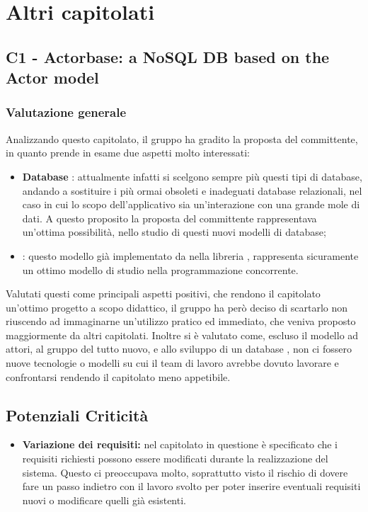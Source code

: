 \section{Altri capitolati}

\subsection{C1 - Actorbase: a NoSQL DB based on the Actor model}
\subsubsection{Valutazione generale}
Analizzando questo capitolato, il gruppo ha gradito la proposta del committente, in quanto prende in esame due aspetti molto interessati:
\begin{itemize}
	\item \textbf{Database }: attualmente infatti si scelgono sempre pi\`u questi tipi di database, andando a sostituire i pi\`u ormai obsoleti e inadeguati database relazionali, nel caso in cui lo scopo dell'applicativo sia un'interazione con una grande mole di dati.
	A questo proposito la proposta del committente rappresentava un'ottima possibilit\`a, nello studio di questi nuovi modelli di database;
	\item \textbf{}: questo modello gi\`a implementato da nella libreria , rappresenta sicuramente un ottimo modello di studio nella programmazione concorrente.
\end{itemize}
Valutati questi come principali aspetti positivi, che rendono il capitolato un'ottimo progetto a scopo didattico, il gruppo ha per\`o deciso di scartarlo non riuscendo ad immaginarne un'utilizzo pratico ed immediato, che veniva proposto maggiormente da altri capitolati.
Inoltre si \`e valutato come, escluso il modello ad attori, al gruppo del tutto nuovo, e allo sviluppo di un database , non ci fossero nuove tecnologie o modelli su cui il team di lavoro avrebbe dovuto lavorare e confrontarsi rendendo il capitolato meno appetibile.  

\subsection{Potenziali Criticità}

\begin{itemize}
	\item \textbf{Variazione dei requisiti:} nel capitolato in questione è specificato che i requisiti richiesti possono essere modificati durante la realizzazione del sistema. Questo ci preoccupava molto, soprattutto visto il rischio di dovere fare un passo indietro con il lavoro svolto per poter inserire eventuali requisiti nuovi o modificare quelli già esistenti.
\end{itemize}

